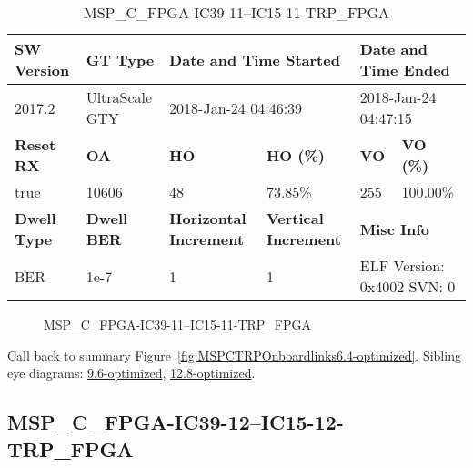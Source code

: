\begin{table}[h]
\centering
\caption{MSP\_C\_FPGA-IC39-11--IC15-11-TRP\_FPGA}
\label{tab:MSPCFPGAIC3911IC1511TRPFPGA6.4-optimized}
\begin{tabular}{@{}|l|l|l|l|l|l|@{}}
\toprule
\textbf{SW Version}                & \textbf{GT Type}   & \multicolumn{2}{l|}{\textbf{Date and Time Started}}            & \multicolumn{2}{l|}{\textbf{Date and Time Ended}}        \\ \midrule
2017.2                       & UltraScale GTY          & \multicolumn{2}{l|}{2018-Jan-24 04:46:39}                   & \multicolumn{2}{l|}{2018-Jan-24 04:47:15}               \\ \midrule
\textbf{Reset RX}                  & \textbf{OA} & \textbf{HO}   & \textbf{HO (\%)} & \textbf{VO} & \textbf{VO (\%)} \\ \midrule
true & 10606        & 48          & 73.85\%        & 255        & 100.00\%       \\ \midrule
\textbf{Dwell Type}                & \textbf{Dwell BER} & \textbf{Horizontal Increment} & \textbf{Vertical Increment}    & \multicolumn{2}{l|}{\textbf{Misc Info}}                  \\ \midrule
BER                            & 1e-7        & 1        & 1           & \multicolumn{2}{l|}{ELF Version: 0x4002 SVN: 0}                         \\ \bottomrule
\end{tabular}
\end{table}

\begin{figure}[h]
\caption{MSP\_C\_FPGA-IC39-11--IC15-11-TRP\_FPGA} \label{fig:MSPCFPGAIC3911IC1511TRPFPGA6.4-optimized}
\end{figure}

Call back to summary Figure~\ref{fig:MSPCTRPOnboardlinks6.4-optimized}.
Sibling eye diagrams: \hyperref[sec:MSPCFPGAIC3911IC1511TRPFPGA9.6-optimized]{9.6-optimized}, \hyperref[sec:MSPCFPGAIC3911IC1511TRPFPGA12.8-optimized]{12.8-optimized}.

\clearpage
\newpage


\subsection{MSP\_C\_FPGA-IC39-12--IC15-12-TRP\_FPGA}\label{sec:MSPCFPGAIC3912IC1512TRPFPGA6.4-optimized}

